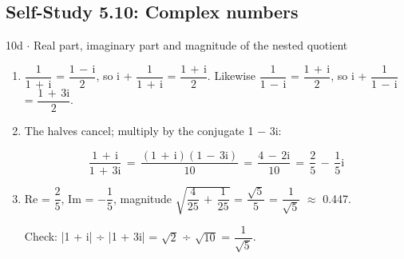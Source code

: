 \documentclass[11pt]{article}
\begin{document}
\begin{keepsection}\subsection{Self-Study 5.10: Complex numbers}

\begin{workedbox}{10d \ensuremath{\cdot} Real part, imaginary part and magnitude of the nested quotient}
\begin{enumerate}
\item {\small\ensuremath{\dfrac{1}{1\, +\, \mathrm{i}}}} = {\small\ensuremath{\dfrac{1\, -\, \mathrm{i}}{2}}}, so i + {\small\ensuremath{\dfrac{1}{1\, +\, \mathrm{i}}}} = {\small\ensuremath{\dfrac{1\, +\, \mathrm{i}}{2}}}. Likewise {\small\ensuremath{\dfrac{1}{1\, -\, \mathrm{i}}}} = {\small\ensuremath{\dfrac{1\, +\, \mathrm{i}}{2}}}, so i + {\small\ensuremath{\dfrac{1}{1\, -\, \mathrm{i}}}} = {\small\ensuremath{\dfrac{1\, +\, 3\mathrm{i}}{2}}}.
\item {}
The halves cancel; multiply by the conjugate 1 \ensuremath{-} 3i:

\begin{equation*}\dfrac{1\, +\, \mathrm{i}}{1\, +\, 3\mathrm{i}}\, =\, \dfrac{(1\, +\, \mathrm{i})(1\, -\, 3\mathrm{i})}{10}\, =\, \dfrac{4\, -\, 2\mathrm{i}}{10}\, =\, \dfrac{2}{5}\, -\, \dfrac{1}{5}\mathrm{i}\end{equation*}
\item {}
Re = {\small\ensuremath{\dfrac{2}{5}}}, Im = \ensuremath{-}{\small\ensuremath{\dfrac{1}{5}}}, magnitude \ensuremath{\sqrt{\dfrac{4}{25}\, +\, \dfrac{1}{25}}} = {\small\ensuremath{\dfrac{\sqrt{5}}{5}}} = {\small\ensuremath{\dfrac{1}{\sqrt{5}}}} \ensuremath{\approx} 0.447.

Check: |1 + i| ÷ |1 + 3i| = \ensuremath{\sqrt{2}} ÷ \ensuremath{\sqrt{10}} = {\small\ensuremath{\dfrac{1}{\sqrt{5}}}}.
\end{enumerate}
\end{workedbox}

\end{keepsection}
\end{document}
